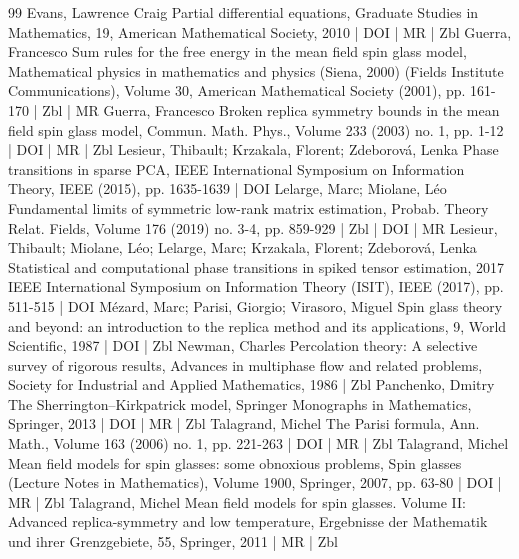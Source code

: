 \begin{thebibliography}{99}
Evans, Lawrence Craig Partial differential equations, Graduate Studies in Mathematics, 19, American Mathematical Society, 2010 | DOI | MR | Zbl
Guerra, Francesco Sum rules for the free energy in the mean field spin glass model, Mathematical physics in mathematics and physics (Siena, 2000) (Fields Institute Communications), Volume 30, American Mathematical Society (2001), pp. 161-170 | Zbl | MR
Guerra, Francesco Broken replica symmetry bounds in the mean field spin glass model, Commun. Math. Phys., Volume 233 (2003) no. 1, pp. 1-12 | DOI | MR | Zbl
Lesieur, Thibault; Krzakala, Florent; Zdeborová, Lenka Phase transitions in sparse PCA, IEEE International Symposium on Information Theory, IEEE (2015), pp. 1635-1639 | DOI
Lelarge, Marc; Miolane, Léo Fundamental limits of symmetric low-rank matrix estimation, Probab. Theory Relat. Fields, Volume 176 (2019) no. 3-4, pp. 859-929 | Zbl | DOI | MR
Lesieur, Thibault; Miolane, Léo; Lelarge, Marc; Krzakala, Florent; Zdeborová, Lenka Statistical and computational phase transitions in spiked tensor estimation, 2017 IEEE International Symposium on Information Theory (ISIT), IEEE (2017), pp. 511-515 | DOI
Mézard, Marc; Parisi, Giorgio; Virasoro, Miguel Spin glass theory and beyond: an introduction to the replica method and its applications, 9, World Scientific, 1987 | DOI | Zbl
Newman, Charles Percolation theory: A selective survey of rigorous results, Advances in multiphase flow and related problems, Society for Industrial and Applied Mathematics, 1986 | Zbl
Panchenko, Dmitry The Sherrington–Kirkpatrick model, Springer Monographs in Mathematics, Springer, 2013 | DOI | MR | Zbl
Talagrand, Michel The Parisi formula, Ann. Math., Volume 163 (2006) no. 1, pp. 221-263 | DOI | MR | Zbl
Talagrand, Michel Mean field models for spin glasses: some obnoxious problems, Spin glasses (Lecture Notes in Mathematics), Volume 1900, Springer, 2007, pp. 63-80 | DOI | MR | Zbl
Talagrand, Michel Mean field models for spin glasses. Volume II: Advanced replica-symmetry and low temperature, Ergebnisse der Mathematik und ihrer Grenzgebiete, 55, Springer, 2011 | MR | Zbl
\end{thebibliography}
